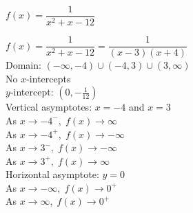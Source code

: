 {$f(x) = \dfrac{1}{x^{2} + x - 12}$}
{$f(x) = \dfrac{1}{x^{2} + x - 12} = \dfrac{1}{(x - 3)(x + 4)}$\\
Domain: $(-\infty, -4) \cup (-4, 3) \cup (3, \infty)$\\
No $x$-intercepts\\
$y$-intercept: $(0, -\frac{1}{12})$\\
Vertical asymptotes: $x = -4$ and $x = 3$\\
As $x \rightarrow -4^{-}, \; f(x) \rightarrow \infty$\\
As $x \rightarrow -4^{+}, \; f(x) \rightarrow -\infty$\\
As $x \rightarrow 3^{-}, \; f(x) \rightarrow -\infty$\\
As $x \rightarrow 3^{+}, \; f(x) \rightarrow \infty$\\
Horizontal asymptote: $y = 0$\\
As $x \rightarrow -\infty, \; f(x) \rightarrow 0^{+}$\\
As $x \rightarrow \infty, \; f(x) \rightarrow 0^{+}$

\begin{center}
\end{center}}